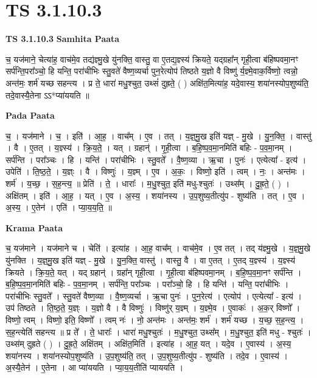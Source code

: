 \documentclass[17pt]{extarticle}
\begin{document}
\section{ TS 3.1.10.3 }

\textbf{TS 3.1.10.3 } \newline
\textbf{Samhita Paata} \newline

च॒ यज॑माने॒ चेत्या॑ह॒ वाच॑मे॒व तद्य॑ज्ञ्मु॒खे यु॑नक्ति॒ वास्तु॒ वा ए॒तद्य॒ज्ञ्स्य॑ क्रियते॒ यद्ग्रहा᳚न् गृही॒त्वा ब॑हिष्पवमा॒नꣳ सर्प॑न्ति॒परा᳚ञ्चो॒ हि यन्ति॒ परा॑चीभिः स्तु॒वते॑ वैष्ण॒व्यर्चा पुन॒रेत्योप॑ तिष्ठते य॒ज्ञो वै विष्णु॑ र्य॒ज्ञ्मे॒वाक॒र्विष्णो॒ त्वन्नो॒ अन्त॑मः॒ शर्म॑ यच्छ सहन्त्य । प्र ते॒ धारा॑ मधु॒श्चुत॒ उथ्सं॑ दुह्रते॒ ( ) अक्षि॑त॒मित्या॑ह॒ यदे॒वास्य॒ शया॑नस्योप॒शुष्य॑ति॒ तदे॒वास्यै॒तेना ऽऽ*प्या॑ययति ॥ \newline

\textbf{Pada Paata} \newline

च॒ । यज॑माने । च॒ । इति॑ । आ॒ह॒ । वाच᳚म् । ए॒व । तत् । य॒ज्ञ्॒मु॒ख इति॑ यज्ञ् - मु॒खे । यु॒न॒क्ति॒ । वास्तु॑ । वै । ए॒तत् । य॒ज्ञ्स्य॑ । क्रि॒य॒ते॒ । यत् । ग्रहान्॑ । गृ॒ही॒त्वा । ब॒हि॒ष्प॒व॒मा॒नमिति॑ बहिः - प॒व॒मा॒नम् । सर्प॑न्ति । परा᳚ञ्चः । हि । यन्ति॑ । परा॑चीभिः । स्तु॒वते᳚ । वै॒ष्ण॒व्या । ऋ॒चा । पुनः॑ । एत्येत्या᳚ - इत्य॑ । उपेति॑ । ति॒ष्ठ॒ते॒ । य॒ज्ञ्ः । वै । विष्णुः॑ । य॒ज्ञ्म् । ए॒व । अ॒कः॒ । विष्णो॒ इति॑ । त्वम् । नः॒ । अन्त॑मः । शर्म॑ । य॒च्छ॒ । स॒ह॒न्त्य॒ ॥ प्रेति॑ । ते॒ । धाराः᳚ । म॒धु॒श्चुत॒ इति॑ मधु-श्चुतः॑ । उथ्स᳚म् । दु॒ह्र॒ते॒ ( ) । अक्षि॑तम् । इति॑ । आ॒ह॒ । यत् । ए॒व । अ॒स्य॒ । शया॑नस्य । उ॒प॒शुष्य॒तीत्यु॑प - शुष्य॑ति । तत् । ए॒व । अ॒स्य॒ । ए॒तेन॑ । एति॑ । प्या॒य॒य॒ति॒ ॥  \newline


\textbf{Krama Paata} \newline

च॒ यज॑माने । यज॑माने च । चेति॑ । इत्या॑ह । आ॒ह॒ वाच᳚म् । वाच॑मे॒व । ए॒व तत् । तद् य॑ज्ञ्मु॒खे । य॒ज्ञ्॒मु॒खे यु॑नक्ति । य॒ज्ञ्॒मु॒ख इति॑ यज्ञ् - मु॒खे । यु॒न॒क्ति॒ वास्तु॑ । वास्तु॒ वै । वा ए॒तत् । ए॒तद् य॒ज्ञ्स्य॑ । य॒ज्ञ्स्य॑ क्रियते । क्रि॒य॒ते॒ यत् । यद् ग्रहान्॑ । ग्रहा᳚न् गृही॒त्वा । गृ॒ही॒त्वा ब॑हिष्पवमा॒नम् । ब॒हि॒ष्प॒व॒मा॒नꣳ सर्प॑न्ति । ब॒हि॒ष्प॒व॒मा॒नमिति॑ बहिः - प॒व॒मा॒नम् । सर्प॑न्ति॒ परा᳚ञ्चः । परा᳚ञ्चो॒ हि । हि यन्ति॑ । यन्ति॒ परा॑चीभिः । परा॑चीभिः स्तु॒वते᳚ । स्तु॒वते॑ वैष्ण॒व्या । वै॒ष्ण॒व्यर्चा । ऋ॒चा पुनः॑ । पुन॒रेत्य॑ । एत्योप॑ । एत्येत्या᳚ - इत्य॑ । उप॑ तिष्ठते । ति॒ष्ठ॒ते॒ य॒ज्ञ्ः । य॒ज्ञो वै । वै विष्णुः॑ । विष्णु॑र् य॒ज्ञ्म् । य॒ज्ञ्मे॒व । ए॒वाकः॑ । अ॒क॒र् विष्णो᳚ । विष्णो॒ त्वम् । विष्णो॒ इति॒ विष्णो᳚ । त्वम् नः॑ । नो॒ अन्त॑मः । अन्त॑मः॒ शर्म॑ । शर्म॑ यच्छ । य॒च्छ॒ स॒ह॒न्त्य॒ । स॒ह॒न्त्येति॑ सहन्त्य ॥ प्र ते᳚ । ते॒ धाराः᳚ । धारा॑ मधु॒श्चुतः॑ । म॒धु॒श्चुत॒ उथ्स᳚म् । म॒धु॒श्चुत॒ इति॑ मधु - श्चुतः॑ । उथ्स॑म् दुह्रते ( ) । दु॒ह्र॒ते॒ अक्षि॑तम् । अक्षि॑त॒मिति॑ । इत्या॑ह । आ॒ह॒ यत् । यदे॒व । ए॒वास्य॑ । अ॒स्य॒ शया॑नस्य । शया॑नस्योप॒शुष्य॑ति । उ॒प॒शुष्य॑ति॒ तत् । उ॒प॒शुष्य॒तीत्यु॑प - शुष्य॑ति । तदे॒व । ए॒वास्य॑ । अ॒स्यै॒तेन॑ । ए॒तेना । आ प्या॑ययति । प्या॒य॒य॒तीति॑ प्याययति । \newline
\end{document}
